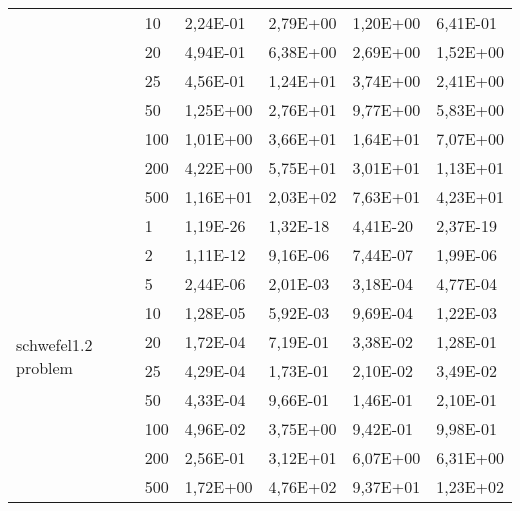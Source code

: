 \begin{longtable}[c]{|p{3.5cm}|l|l|l|l|l|}
                                        & 10        & 2,24E-01   & 2,79E+00   & 1,20E+00   & 6,41E-01  \\ \cline{2-6} 
                                        & 20        & 4,94E-01   & 6,38E+00   & 2,69E+00   & 1,52E+00  \\ \cline{2-6} 
                                        & 25        & 4,56E-01   & 1,24E+01   & 3,74E+00   & 2,41E+00  \\ \cline{2-6} 
                                        & 50        & 1,25E+00   & 2,76E+01   & 9,77E+00   & 5,83E+00  \\ \cline{2-6} 
                                        & 100       & 1,01E+00   & 3,66E+01   & 1,64E+01   & 7,07E+00  \\ \cline{2-6} 
                                        & 200       & 4,22E+00   & 5,75E+01   & 3,01E+01   & 1,13E+01  \\ \cline{2-6} 
                                        & 500       & 1,16E+01   & 2,03E+02   & 7,63E+01   & 4,23E+01  \\ \hline
\multirow[t]{10}{*}{schwefel1.2 problem}   & 1         & 1,19E-26   & 1,32E-18   & 4,41E-20   & 2,37E-19  \\ \cline{2-6} 
                                        & 2         & 1,11E-12   & 9,16E-06   & 7,44E-07   & 1,99E-06  \\ \cline{2-6} 
                                        & 5         & 2,44E-06   & 2,01E-03   & 3,18E-04   & 4,77E-04  \\ \cline{2-6} 
                                        & 10        & 1,28E-05   & 5,92E-03   & 9,69E-04   & 1,22E-03  \\ \cline{2-6} 
                                        & 20        & 1,72E-04   & 7,19E-01   & 3,38E-02   & 1,28E-01  \\ \cline{2-6} 
                                        & 25        & 4,29E-04   & 1,73E-01   & 2,10E-02   & 3,49E-02  \\ \cline{2-6} 
                                        & 50        & 4,33E-04   & 9,66E-01   & 1,46E-01   & 2,10E-01  \\ \cline{2-6} 
                                        & 100       & 4,96E-02   & 3,75E+00   & 9,42E-01   & 9,98E-01  \\ \cline{2-6} 
                                        & 200       & 2,56E-01   & 3,12E+01   & 6,07E+00   & 6,31E+00  \\ \cline{2-6} 
                                        & 500       & 1,72E+00   & 4,76E+02   & 9,37E+01   & 1,23E+02  \\ \hline

\end{longtable}
